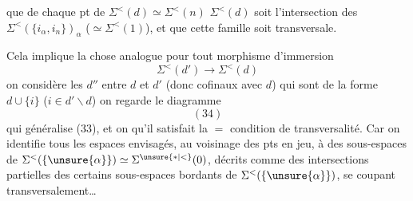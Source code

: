 que  de chaque pt de $\Sigma^{<}(d)\simeq\Sigma^{<}(n)$ $\Sigma^{<}(d)$ soit l'intersection  des $\Sigma^{<}(\{i_\alpha,i_n\})_\alpha$ ($\simeq\Sigma^{<}(1)$), et que cette famille soit transversale.

Cela implique la chose analogue pour tout morphisme d'immersion
\[
\Sigma^{<}(d')\longrightarrow\Sigma^{<}(d)
\]
on considère les $d''$ entre $d$ et $d'$ (donc cofinaux avec $d$) qui sont de la forme $d\cup\{i\}$ ($i\in d'\smallsetminus d$) on regarde le diagramme
\[
(34)
\]
qui généralise (33), et on  qu'il satisfait la $=$ condition de transversalité. Car on identifie tous les espaces envisagés, au voisinage des pts en jeu, à des sous-espaces de $\Sigma^{<}(\{\unsure{\alpha}\})\simeq\Sigma^{\unsure{*|<}}(0)$, décrits  comme des intersections partielles des certains sous-espaces bordants de $\Sigma^{<}(\{\unsure{\alpha}\})$, se coupant transversalement\ldots
{}
